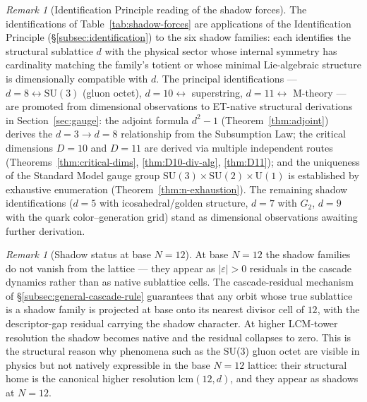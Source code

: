 \documentclass[11pt,a4paper]{article}
\theoremstyle{definition}
\theoremstyle{remark}
\newtheorem{remark}[theorem]{Remark}
\begin{document}
\begin{remark}[Identification Principle reading of the shadow forces]\label{rem:shadow-identification}
The identifications of Table~\ref{tab:shadow-forces} are applications of the Identification Principle (\S\ref{subsec:identification}) to the six shadow families: each identifies the structural sublattice $d$ with the physical sector whose internal symmetry has cardinality matching the family's totient or whose minimal Lie-algebraic structure is dimensionally compatible with $d$. The principal identifications --- $d=8 \leftrightarrow \mathrm{SU}(3)$ (gluon octet), $d=10 \leftrightarrow$ superstring, $d=11 \leftrightarrow$ M-theory --- are promoted from dimensional observations to ET-native structural derivations in Section~\ref{sec:gauge}: the adjoint formula $d^{2}-1$ (Theorem~\ref{thm:adjoint}) derives the $d=3 \to d=8$ relationship from the Subsumption Law; the critical dimensions $D=10$ and $D=11$ are derived via multiple independent routes (Theorems~\ref{thm:critical-dims}, \ref{thm:D10-div-alg}, \ref{thm:D11}); and the uniqueness of the Standard Model gauge group $\mathrm{SU}(3)\times\mathrm{SU}(2)\times\mathrm{U}(1)$ is established by exhaustive enumeration (Theorem~\ref{thm:n-exhaustion}). The remaining shadow identifications ($d=5$ with icosahedral/golden structure, $d=7$ with $G_{2}$, $d=9$ with the quark color--generation grid) stand as dimensional observations awaiting further derivation.
\end{remark}

\begin{remark}[Shadow status at base $N=12$]\label{rem:shadow-base}
At base $N=12$ the shadow families do not vanish from the lattice --- they appear as $|\varepsilon|>0$ residuals in the cascade dynamics rather than as native sublattice cells. The cascade-residual mechanism of \S\ref{subsec:general-cascade-rule} guarantees that any orbit whose true sublattice is a shadow family is projected at base onto its nearest divisor cell of $12$, with the descriptor-gap residual carrying the shadow character. At higher LCM-tower resolution the shadow becomes native and the residual collapses to zero. This is the structural reason why phenomena such as the SU(3) gluon octet are visible in physics but not natively expressible in the base $N=12$ lattice: their structural home is the canonical higher resolution $\mathrm{lcm}(12,d)$, and they appear as shadows at $N=12$.
\end{remark}

\end{document}
